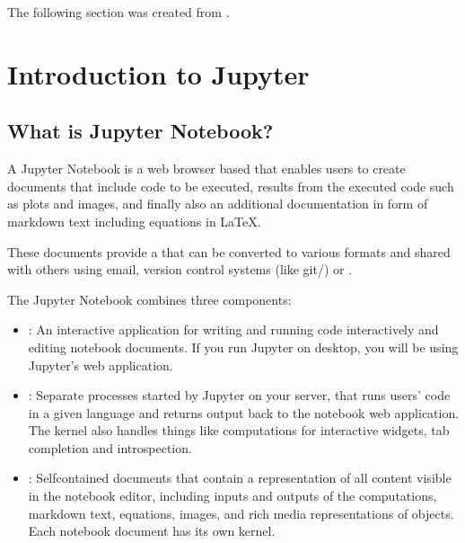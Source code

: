 \documentclass[letterpaper,10pt,english]{sphinxmanual}
\begin{document}
\sphinxAtStartPar
The following section was created from .


\chapter{Introduction to Jupyter}
\label{\detokenize{notebooks/Intro/Introduction2Jupyter:Introduction-to-Jupyter}}\label{\detokenize{notebooks/Intro/Introduction2Jupyter::doc}}

\section{What is Jupyter Notebook?}
\label{\detokenize{notebooks/Intro/Introduction2Jupyter:What-is-Jupyter-Notebook?}}
\sphinxAtStartPar
A Jupyter Notebook is a web browser based  that enables users to create documents that include code to be executed, results from the executed code such as plots and images, and finally also an additional documentation in form of markdown text including equations in LaTeX.

\sphinxAtStartPar
These documents provide a  that can be converted to various formats and shared with others using email, version control systems (like git/) or .

\sphinxAtStartPar
The Jupyter Notebook combines three components:
\begin{itemize}
\item {} 
\sphinxAtStartPar
{}: An interactive application for writing and running code interactively and editing notebook documents. If you run Jupyter on desktop, you will be using Jupyter’s web application.

\item {} 
\sphinxAtStartPar
{}: Separate processes started by Jupyter on your server, that runs users’ code in a given language and returns output back to the notebook web application. The kernel also handles things like computations for interactive widgets, tab completion and introspection.

\item {} 
\sphinxAtStartPar
{}: Self\sphinxhyphen{}contained documents that contain a representation of all content visible in the notebook editor, including inputs and outputs of the computations, markdown text, equations, images, and rich media representations of objects. Each notebook document has its own kernel.

\end{itemize}
\end{document}
